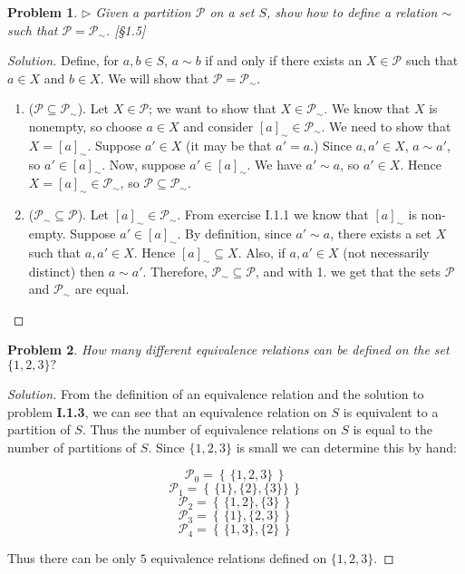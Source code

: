 \documentclass[fontsize=14pt]{scrartcl}
\newtheorem{problem-internal}{Problem}[subsection]
\newenvironment{problem}{
  \medskip
  \begin{problem-internal}
}{
  \end{problem-internal}
}
\newenvironment{solution}{
  \begin{proof}[Solution]
  \vspace{-8px}
  \setlength{\parskip}{4px}
  \setlength{\parindent}{0px}
}{
  \end{proof}
}
\newcommand{\set}[1]{\left\{\,#1\,\right\}}
\begin{document}
\begin{problem}
$\rhd$ Given a partition $\mathscr{P}$ on a set $S$, show how to define a
relation $\sim$ such that $\mathscr{P} = \mathscr{P}_{\sim}$. [\S1.5]
\end{problem}

\begin{solution}
Define, for $a,b\in S$, $a\sim b$ if and only if there exists
an $X\in\mathscr{P}$ such that $a\in X$ and $b\in X$. We will show that
$\mathscr{P} = \mathscr{P}_{\sim}$. 

\begin{enumerate}
\item ($\mathscr{P}\subseteq\mathscr{P}_{\sim}$). Let $X\in \mathscr{P}$; we want to
show that $X\in\mathscr{P}_{\sim}$. We know that $X$ is
nonempty, so choose $a\in X$ and consider $[a]_{\sim}\in\mathscr{P}_{\sim}$. We
need to show that $X=[a]_{\sim}$. Suppose $a'\in X$ (it may be that $a'=a$.)
Since $a,a'\in X$, $a\sim a'$, so $a'\in[a]_{\sim}$. Now, suppose $a'\in
[a]_{\sim}$. We have $a'\sim a$, so $a'\in X$. Hence $X=[a]_{\sim}\in
\mathscr{P}_{\sim}$, so $\mathscr{P}\subseteq\mathscr{P}_{\sim}$.

\item ($\mathscr{P}_{\sim}\subseteq\mathscr{P}$). Let $[a]_{\sim}\in\mathscr{P}_{\sim}$.
From exercise I.1.1 we know that $[a]_{\sim}$ is non-empty. Suppose
$a'\in[a]_{\sim}$. By definition, since $a'\sim a$, there exists a set $X$ such
that $a,a'\in X$. Hence $[a]_{\sim}\subseteq X$. Also, if $a,a'\in X$ (not
necessarily distinct) then $a\sim a'$. Therefore,
$\mathscr{P}_{\sim}\subseteq\mathscr{P}$, and with 1. we get that the sets
$\mathscr{P}$ and $\mathscr{P}_{\sim}$ are equal.
\end{enumerate}
\end{solution}


\begin{problem}
How many different equivalence relations can be defined on the set $\{1,2,3\}?$
\end{problem}

\begin{solution}
From the definition of an equivalence relation and the solution to problem
\textbf{I.1.3}, we can see that an equivalence relation on $S$ is equivalent to
a partition of $S$. Thus the number of equivalence relations on $S$ is equal to
the number of partitions of $S$. Since $\{1,2,3\}$ is small we can determine
this by hand:

\[ \mathscr{P}_0 = \set{\{1,2,3\}} \]
\[ \mathscr{P}_1 = \set{\{1\},\{2\},\{3\}\}} \]
\[ \mathscr{P}_2 = \set{\{1,2\},\{3\}} \]
\[ \mathscr{P}_3 = \set{\{1\},\{2,3\}} \]
\[ \mathscr{P}_4 = \set{\{1,3\},\{2\}} \]

Thus there can be only $5$ equivalence relations defined on $\{1,2,3\}$.
\end{solution}
\end{document}
